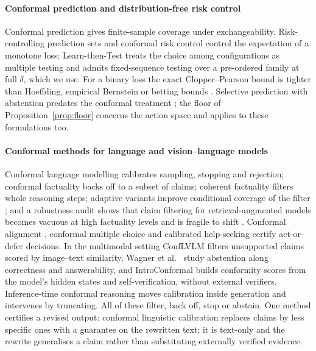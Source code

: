 \paragraph{Conformal prediction and distribution-free risk control}
Conformal prediction \citep{vovk2005,papadopoulos2002,lei2018,angelopoulos2023gentle} gives
finite-sample coverage under exchangeability. Risk-controlling prediction sets \citep{bates2021rcps}
and conformal risk control \citep{angelopoulos2024crc} control the expectation of a monotone
loss; Learn-then-Test \citep{angelopoulos2021ltt} treats the choice among configurations as
multiple testing and admits fixed-sequence testing over a pre-ordered family at full $\delta$,
which we use. For a binary loss the exact Clopper--Pearson bound \citep{clopper1934} is tighter
than Hoeffding, empirical Bernstein or betting bounds \citep{waudbysmith2024}.
Selective prediction with abstention predates the conformal treatment
\citep{chow1970,elyaniv2010,bartlett2008,cortes2016,geifman2019}; the floor of
Proposition~\ref{prop:floor} concerns the action space and applies to these formulations too.

\paragraph{Conformal methods for language and vision--language models}
Conformal language modelling \citep{conformallm} calibrates sampling, stopping and rejection;
conformal factuality \citep{conformalfactuality} backs off to a subset of claims;
coherent factuality \citep{rubintoles2025coherent} filters whole reasoning steps; adaptive
variants improve conditional coverage of the filter \citep{rubashevskii2026adaptive}; and a robustness
audit shows that claim filtering for retrieval-augmented models becomes vacuous at high
factuality levels and is fragile to shift \citep{chen2026ragconformal}. Conformal alignment
\citep{gui2024conformal}, conformal multiple choice \citep{kumar2023} and calibrated help-seeking
\citep{ren2023knowno} certify act-or-defer decisions. In the multimodal setting ConfLVLM
\citep{conflvlm} filters unsupported claims scored by image--text similarity, Wagner et al.\
\citep{twoaxes} study abstention along correctness and answerability, and IntroConformal
\citep{atabuzzaman2026introconformal} builds conformity scores from the model's hidden states and
self-verification, without external verifiers. Inference-time conformal reasoning
\citep{wang2026itcr} moves calibration inside generation and intervenes by truncating. All of
these filter, back off, stop or abstain. One method certifies a revised output:
conformal linguistic calibration \citep{jiang2025clc} replaces claims by less specific ones with a
guarantee on the rewritten text; it is text-only and the rewrite generalises a claim rather than
substituting externally verified evidence.

